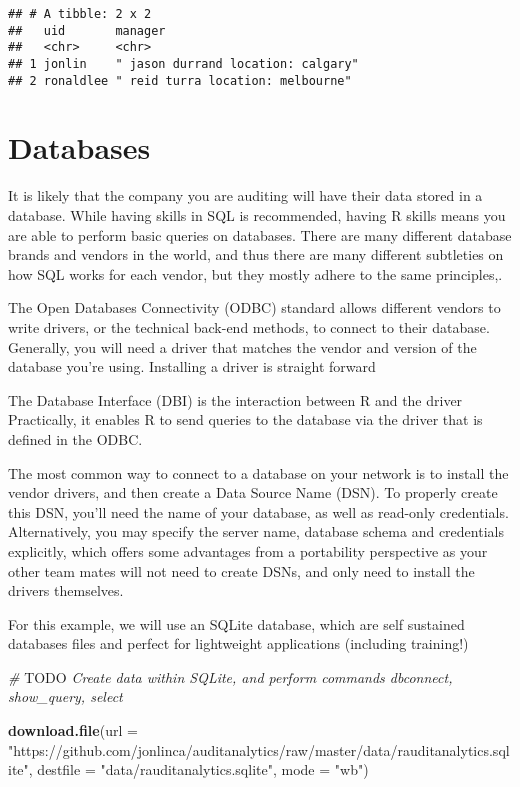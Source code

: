 \documentclass[
]{book}
\newenvironment{Shaded}{\begin{snugshade}}{\end{snugshade}}
\newcommand{\AlertTok}[1]{\textcolor[rgb]{0.94,0.16,0.16}{#1}}
\newcommand{\CommentTok}[1]{\textcolor[rgb]{0.56,0.35,0.01}{\textit{#1}}}
\newcommand{\DataTypeTok}[1]{\textcolor[rgb]{0.13,0.29,0.53}{#1}}
\newcommand{\KeywordTok}[1]{\textcolor[rgb]{0.13,0.29,0.53}{\textbf{#1}}}
\newcommand{\NormalTok}[1]{#1}
\newcommand{\StringTok}[1]{\textcolor[rgb]{0.31,0.60,0.02}{#1}}
\begin{document}
\begin{verbatim}
## # A tibble: 2 x 2
##   uid       manager                           
##   <chr>     <chr>                             
## 1 jonlin    " jason durrand location: calgary"
## 2 ronaldlee " reid turra location: melbourne"
\end{verbatim}

\hypertarget{databases-1}{%
\section{Databases}\label{databases-1}}

It is likely that the company you are auditing will have their data stored in a database. While having skills in SQL is recommended, having R skills means you are able to perform basic queries on databases. There are many different database brands and vendors in the world, and thus there are many different subtleties on how SQL works for each vendor, but they mostly adhere to the same principles,.

The Open Databases Connectivity (ODBC) standard allows different vendors to write drivers, or the technical back-end methods, to connect to their database. Generally, you will need a driver that matches the vendor and version of the database you're using. Installing a driver is straight forward

The Database Interface (DBI) is the interaction between R and the driver Practically, it enables R to send queries to the database via the driver that is defined in the ODBC.

The most common way to connect to a database on your network is to install the vendor drivers, and then create a Data Source Name (DSN). To properly create this DSN, you'll need the name of your database, as well as read-only credentials. Alternatively, you may specify the server name, database schema and credentials explicitly, which offers some advantages from a portability perspective as your other team mates will not need to create DSNs, and only need to install the drivers themselves.

For this example, we will use an SQLite database, which are self sustained databases files and perfect for lightweight applications (including training!)

\begin{Shaded}
\begin{Highlighting}[]
\CommentTok{# }\AlertTok{TODO}\CommentTok{ Create data within SQLite, and perform commands dbconnect, show_query, select}

\KeywordTok{download.file}\NormalTok{(}\DataTypeTok{url =} \StringTok{"https://github.com/jonlinca/auditanalytics/raw/master/data/rauditanalytics.sqlite"}\NormalTok{,}
             \DataTypeTok{destfile =} \StringTok{"data/rauditanalytics.sqlite"}\NormalTok{, }\DataTypeTok{mode =} \StringTok{"wb"}\NormalTok{)}
\end{Highlighting}
\end{Shaded}
\end{document}
